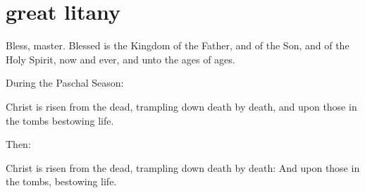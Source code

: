\section{great litany}

\begin{liturgicaltext}
    \deacon Bless, master. 
    \priest Blessed is the Kingdom of the Father, and of the Son, and of the Holy Spirit, now and ever, and unto the ages of ages.
    \choir {}
\end{liturgicaltext}

\begin{rubricsection}
    \begin{rubricmed}
        During the Paschal Season:
    \end{rubricmed}
    \begin{liturgicaltext}
        \clergy Christ is risen from the dead, trampling down death by death, and upon those in the tombs bestowing life. 
    \end{liturgicaltext}
    \begin{rubricmed}
        Then:
    \end{rubricmed}
    \begin{liturgicaltext}
        \clergy Christ is risen from the dead, trampling down death by death:
        \choir And upon those in the tombs, bestowing life.
    \end{liturgicaltext}

\end{rubricsection}

